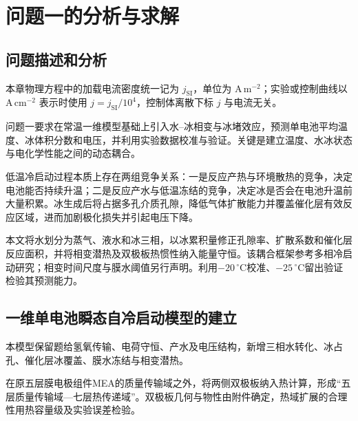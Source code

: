 \documentclass[bwprint]{gmcmthesis}
\numberwithin{equation}{section}
\numberwithin{figure}{section}
\begin{document}
\section{问题一的分析与求解}
\subsection{问题描述和分析}
本章物理方程中的加载电流密度统一记为 $j_{\mathrm{SI}}$，单位为 $\mathrm{A\,m^{-2}}$；实验或控制曲线以 $\mathrm{A\,cm^{-2}}$ 表示时使用 $j=j_{\mathrm{SI}}/10^4$，控制体离散下标 $j$ 与电流无关。

问题一要求在常温一维模型基础上引入水--冰相变与冰堵效应，预测单电池平均温度、冰体积分数和电压，并利用实验数据校准与验证。关键是建立温度、水冰状态与电化学性能之间的动态耦合\cite{tao2022reduction}。

低温冷启动过程本质上存在两组竞争关系：一是反应产热与环境散热的竞争，决定电池能否持续升温；二是反应产水与低温冻结的竞争，决定冰是否会在电池升温前大量积累。冰生成后将占据多孔介质孔隙，降低气体扩散能力并覆盖催化层有效反应区域，进而加剧极化损失并引起电压下降\cite{yao2020failure}。

本文将水划分为蒸气、液水和冰三相，以冰累积量修正孔隙率、扩散系数和催化层反应面积，并将相变潜热及双极板热惯性纳入能量守恒。该耦合框架参考多相冷启动研究\cite{mao2007,jiao2009multiphase}；相变时间尺度与膜水阈值另行声明。利用$-20\,^\circ\mathrm C$校准、$-25\,^\circ\mathrm C$留出验证检验其预测能力。


\subsection{一维单电池瞬态自冷启动模型的建立}
本模型保留题给氢氧传输、电荷守恒、产水及电压结构，新增三相水转化、冰占孔、催化层冰覆盖、膜水冻结与相变潜热。

在原五层膜电极组件MEA的质量传输域之外，将两侧双极板纳入热计算，形成“五层质量传输域—七层热传递域”。双极板几何与物性由附件确定，热域扩展的合理性用热容量级及实验误差检验。
\end{document}

